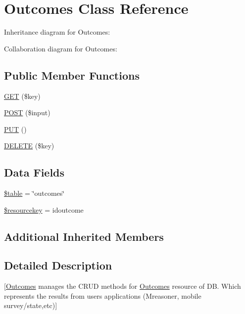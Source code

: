 \hypertarget{class_outcomes}{}\section{Outcomes Class Reference}
\label{class_outcomes}


Inheritance diagram for Outcomes\+:


Collaboration diagram for Outcomes\+:
\subsection*{Public Member Functions}
\begin{DoxyCompactItemize}
\item 
\mbox{\hyperlink{class_outcomes_a7490aac9922424f1e605adf9cda9a78b}{G\+ET}} (\$key)
\item 
\mbox{\hyperlink{class_outcomes_aea3bf4cb6556d5b12c15f871fc0960f6}{P\+O\+ST}} (\$input)
\item 
\mbox{\hyperlink{class_outcomes_a2a21af1d6aaaa31249485c753b86eba1}{P\+UT}} ()
\item 
\mbox{\hyperlink{class_outcomes_a10abe19fb01e7c9a2b88104cf8afc666}{D\+E\+L\+E\+TE}} (\$key)
\end{DoxyCompactItemize}
\subsection*{Data Fields}
\begin{DoxyCompactItemize}
\item 
\mbox{\hyperlink{class_outcomes_ae8876a14058f368335baccf35af4a22b}{\$table}} = \char`\"{}outcomes\char`\"{}
\item 
\mbox{\hyperlink{class_outcomes_aebf9a45aba50bace51a0400cdafdd8d3}{\$resourcekey}} = \textquotesingle{}idoutcome\textquotesingle{}
\end{DoxyCompactItemize}
\subsection*{Additional Inherited Members}


\subsection{Detailed Description}
\mbox{[}\mbox{\hyperlink{class_outcomes}{Outcomes}} manages the C\+R\+UD methods for \mbox{\hyperlink{class_outcomes}{Outcomes}} resource of DB. Which represents the results from users applications (Mreasoner, mobile survey/state,etc)\mbox{]} 


